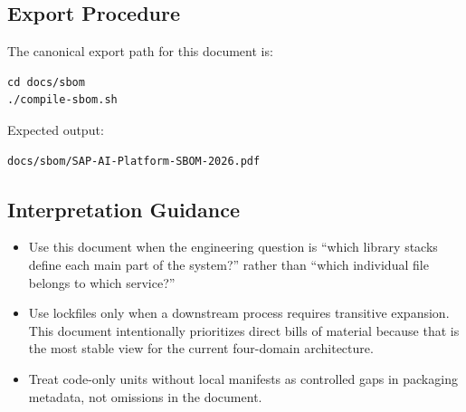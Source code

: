 \documentclass[11pt,a4paper]{article}
\begin{document}
\subsection{Export Procedure}

The canonical export path for this document is:

\begin{lstlisting}
cd docs/sbom
./compile-sbom.sh
\end{lstlisting}

Expected output:

\begin{lstlisting}
docs/sbom/SAP-AI-Platform-SBOM-2026.pdf
\end{lstlisting}

\subsection{Interpretation Guidance}

\begin{itemize}[leftmargin=*]
    \item Use this document when the engineering question is ``which library stacks define each main part of the system?'' rather than ``which individual file belongs to which service?''
    \item Use lockfiles only when a downstream process requires transitive expansion. This document intentionally prioritizes direct bills of material because that is the most stable view for the current four-domain architecture.
    \item Treat code-only units without local manifests as controlled gaps in packaging metadata, not omissions in the document.
\end{itemize}
\end{document}
